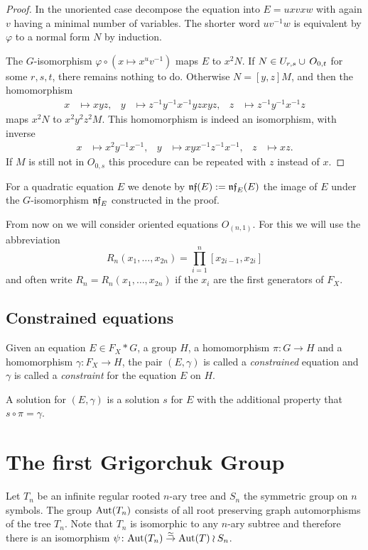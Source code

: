 \documentclass[a4paper,11pt]{amsart}
\begin{document}
\begin{proof}
  In the unoriented case decompose the equation into $E = uxvxw$ with
  again $v$ having a minimal number of variables.  The shorter word
  $uv^{-1}w$ is equivalent by $\varphi$ to a normal form $N$ by
  induction.
 
  The $G$-isomorphism $\varphi \circ (x\mapsto x^uv^{-1})$ maps $E$ to
  $x^2N$. If $N\in U_{r,s}\cup\thinspace O_{0,t}$ for some $r,s,t$,
  there remains nothing to do.  Otherwise $N=[y,z]M$, and then the
  homomorphism
  \begin{align*}
    x&\mapsto xyz, & y&\mapsto z^{-1}y^{-1}x^{-1}yzxyz, & z&\mapsto z^{-1}y^{-1}x^{-1}z
  \end{align*}
  maps $x^2N$ to $x^2y^2z^2M$. This homomorphism is indeed an
  isomorphism, with inverse
  \begin{align*}
    x&\mapsto x^2y^{-1}x^{-1}, & y&\mapsto xyx^{-1}z^{-1}x^{-1}, & z&\mapsto xz.
  \end{align*}
  If $M$ is still not in $O_{0,s}$ this procedure can be repeated with
  $z$ instead of $x$.
\end{proof}
For a quadratic equation $E$ we denote by $\mathfrak{nf}(E) := \mathfrak{nf}_E(E)$
the image of $E$ under the $G$-isomorphism $\mathfrak{nf}_E$ constructed in
the proof.

From now on we will consider oriented equations $O_{(n,1)}$. For this
we will use the abbreviation
\[R_n(x_1,\ldots,x_{2n})=\prod_{i=1}^n [x_{2i-1},x_{2i}]\]
and often write $R_n=R_n(x_1,\ldots,x_{2n})$ if the $x_i$ are the
first generators of $F_X$.

\subsection{Constrained equations}
\begin{defi}
  Given an equation $E \in F_X*G$, a group $H$, a homomorphism
  $\pi\colon G \to H$ and a homomorphism $\gamma\colon F_X \to H$, the
  pair $(E,\gamma)$ is called a \emph{constrained} equation and
  $\gamma$ is called a \emph{constraint} for the equation $E$ on $H$.
 
  A solution for $(E,\gamma)$ is a solution $s$ for $E$ with the
  additional property that $s\circ\pi=\gamma$.
\end{defi}

\section{The first Grigorchuk Group}\label{sec:GrigorchukGroup}
Let $T_n$ be an infinite regular rooted $n$-ary tree and $S_n$ the symmetric group on $n$ symbols.
The group $\textup{Aut}(T_n)$ consists of all root preserving graph automorphisms of the tree $T_n$. 
Note that $T_n$ is isomorphic to any $n$-ary subtree and therefore there is an isomorphism
$\psi\colon \textup{Aut}(T_n)\stackrel{\simeq}{\to} \textup{Aut}(T)\wr S_n$. 
\end{document}
